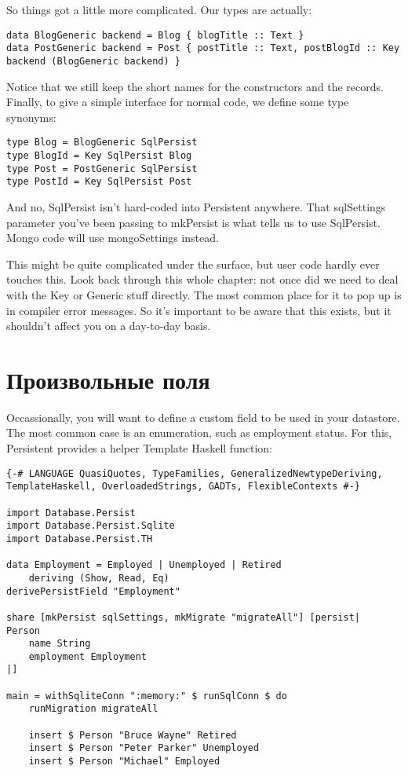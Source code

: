 So things got a little more complicated. Our types are actually:

\begin{lstlisting}
data BlogGeneric backend = Blog { blogTitle :: Text }
data PostGeneric backend = Post { postTitle :: Text, postBlogId :: Key backend (BlogGeneric backend) }
\end{lstlisting}

Notice that we still keep the short names for the constructors and the records. Finally, to give a simple interface for normal code, we define some type synonyms:

\begin{lstlisting}
type Blog = BlogGeneric SqlPersist
type BlogId = Key SqlPersist Blog
type Post = PostGeneric SqlPersist
type PostId = Key SqlPersist Post
\end{lstlisting}

And no, SqlPersist isn't hard-coded into Persistent anywhere. That sqlSettings parameter you've been passing to mkPersist is what tells us to use SqlPersist. Mongo code will use mongoSettings instead.

This might be quite complicated under the surface, but user code hardly ever touches this. Look back through this whole chapter: not once did we need to deal with the Key or Generic stuff directly. The most common place for it to pop up is in compiler error messages. So it's important to be aware that this exists, but it shouldn't affect you on a day-to-day basis.

\section{Произвольные поля} %

Occassionally, you will want to define a custom field to be used in your datastore. The most common case is an enumeration, such as employment status. For this, Persistent provides a helper Template Haskell function:

\begin{lstlisting}
{-# LANGUAGE QuasiQuotes, TypeFamilies, GeneralizedNewtypeDeriving, TemplateHaskell, OverloadedStrings, GADTs, FlexibleContexts #-}

import Database.Persist
import Database.Persist.Sqlite
import Database.Persist.TH

data Employment = Employed | Unemployed | Retired
    deriving (Show, Read, Eq)
derivePersistField "Employment"

share [mkPersist sqlSettings, mkMigrate "migrateAll"] [persist|
Person
    name String
    employment Employment
|]

main = withSqliteConn ":memory:" $ runSqlConn $ do
    runMigration migrateAll

    insert $ Person "Bruce Wayne" Retired
    insert $ Person "Peter Parker" Unemployed
    insert $ Person "Michael" Employed
\end{lstlisting}%

